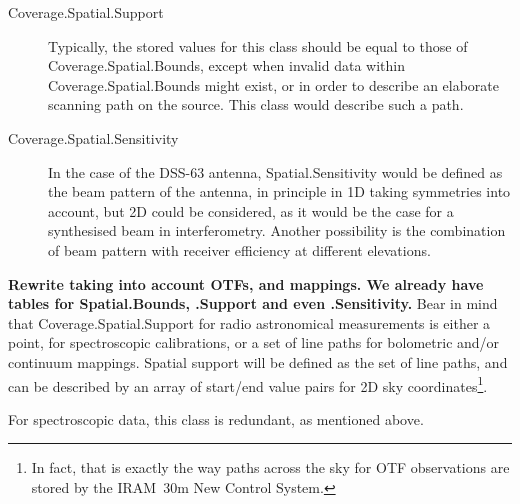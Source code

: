\begin{description}
				 \item[Coverage.Spatial.Support] Typically, the
				stored values for this class should be equal to
				those of Coverage.Spatial.Bounds, except when
				invalid data within Coverage.Spatial.Bounds might
				exist, or in order to describe an elaborate
				scanning path on the source. This class would
				describe such a path.
				
				 \item[Coverage.Spatial.Sensitivity] In the case of
				the DSS-63 antenna, Spatial.Sen\-si\-tivity would
				be defined as the beam pattern of the antenna,
				in principle in 1D taking symmetries into account,
				but 2D could be considered, as it would be the
				case for a synthesised beam in interferometry.
				Another possibility is the combination of beam
				pattern with receiver efficiency at different
				elevations.
			\end{description}
			
			\invisiblenote
			{\textbf{Rewrite taking into account OTFs, and mappings.
			We already have tables for Spatial.Bounds, .Support
			and even .Sensitivity.}
			Bear in mind that Coverage.Spatial.Support for radio
			astronomical measurements is either a point, for
			spectroscopic calibrations, or a set of line paths for
			bolometric and/or continuum mappings. Spatial support
			will be defined as the set of line paths, and can be
			described by an array of start/end value pairs for 2D sky
			coordinates\footnote{In fact, that is exactly the way 
			paths across the sky for OTF observations are stored
			by the IRAM~30m New Control System.}.
			
			 For spectroscopic data, this class is redundant, as
			mentioned above.}
			
